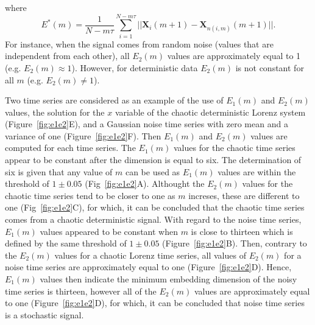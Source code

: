 where
\begin{equation}\label{eq:ee}
E^*(m) = \frac{1}{N-m\tau} \sum_{i=1}^{N-m\tau}
|| \boldsymbol{X}_i(m+1) - \boldsymbol{X}_{n(i,m)}(m+1) ||.
\end{equation}
For instance, when the signal comes from random noise (values that are 
independent from each other), all $E_2(m)$ values are approximately equal 
to 1 (e.g. $E_2(m) \approx 1$). However, for deterministic data $E_2(m)$ is 
not constant for all $m$ (e.g. $E_2(m) \neq 1$).

Two time series are considered as an example of the 
use of $E_1(m)$ and $E_2(m)$ values, 
the solution for the $x$ variable  of the chaotic deterministic Lorenz 
system (Figure~\ref{fig:e1e2}E), and a Gaussian noise time series with 
zero mean and a variance of one (Figure~\ref{fig:e1e2}F).
Then $E_1(m)$ and $E_2(m)$ values are computed for each time series.
The $E_1(m)$ values for the chaotic time series appear to be constant
after the dimension is equal to six. The determination of six is 
given that any value of $m$ can be used as $E_1(m)$ values are within 
the threshold of $1\pm0.05$ (Fig~\ref{fig:e1e2}A). 
Althought the $E_2(m)$ values for the chaotic time series tend to be closer to
one as $m$ increses, these are different to one (Fig~\ref{fig:e1e2}C), 
for which, it can be concluded that the chaotic time series comes 
from a chaotic deterministic signal.
With regard to the noise time series,  $E_1(m)$ values appeared to be constant
when $m$ is close to thirteen which is defined by the same threshold of 
$1\pm0.05$ (Figure~\ref{fig:e1e2}B). 
Then, contrary to the $E_2(m)$ values for a chaotic 
Lorenz time series, all values of $E_2(m)$ for a noise time series are 
approximately equal to one (Figure~\ref{fig:e1e2}D). 
Hence, $E_1(m)$ values then indicate the minimum 
embedding dimension of the noisy time series is thirteen, however all of 
the $E_2(m)$ values are approximately equal to one (Figure~\ref{fig:e1e2}D),
for which, it can be concluded that noise time series is a stochastic signal.

